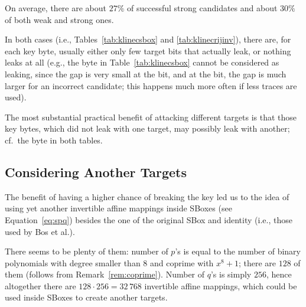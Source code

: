 	On average, there are about $27\%$ of successful strong candidates and about $30\%$ of both weak and strong ones.
	
	In both cases (i.e., Tables~\ref{tab:klinecsbox} and \ref{tab:klinecrijinv}), there are, for each key byte, usually either only few target bits that actually leak, or nothing leaks at all (e.g., the  byte in Table~\ref{tab:klinecsbox} cannot be considered as leaking, since the gap is very small at the  bit, and at the  bit, the gap is much larger for an incorrect candidate; this happens much more often if less traces are used).
	
	The most substantial practical benefit of attacking different targets is that those key bytes, which did not leak with one target, may possibly leak with another; cf.\ the  byte in both tables.



\subsection{Considering Another Targets}
\label{sec:16targets}

The benefit of having a higher chance of breaking the key led us to the idea of using yet another invertible affine mappings inside SBoxes (see Equation~\ref{eq:spq}) besides the one of the original SBox and identity (i.e., those used by Bos et al.).

There seems to be plenty of them: number of $p$'s is equal to the number of binary polynomials with degree smaller than $8$ and coprime with $x^8+1$; there are $128$ of them (follows from Remark~\ref{rem:coprime}). Number of $q$'s is simply $256$, hence altogether there are $128\cdot 256 = 32\,768$ invertible affine mappings, which could be used inside SBoxes to create another targets.

